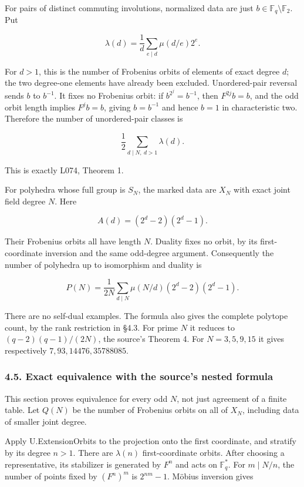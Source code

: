 \documentclass[
  11pt,
  a4paper,
]{article}
\begin{document}
For pairs of distinct commuting involutions, normalized data are just
\(b\in\mathbb F_q\setminus\mathbb F_2\). Put

\[\lambda(d)=\frac1d\sum_{e\mid d}\mu(d/e)2^e.\]

For \(d>1\), this is the number of Frobenius orbits of elements of exact
degree \(d\); the two degree-one elements have already been excluded.
Unordered-pair reversal sends \(b\) to \(b^{-1}\). It fixes no Frobenius
orbit: if \(b^{2^j}=b^{-1}\), then \(F^{2j}b=b\), and the odd orbit
length implies \(F^jb=b\), giving \(b=b^{-1}\) and hence \(b=1\) in
characteristic two. Therefore the number of unordered-pair classes is

\[\boxed{\frac12\sum_{d\mid N,\ d>1}\lambda(d).}\]

This is exactly L074, Theorem 1.

For polyhedra whose full group is \(S_N\), the marked data are \(X_N\)
with exact joint field degree \(N\). Here

\[A(d)=(2^d-2)(2^d-1).\]

Their Frobenius orbits all have length \(N\). Duality fixes no orbit, by
its first-coordinate inversion and the same odd-degree argument.
Consequently the number of polyhedra up to isomorphism and duality is

\[\boxed{P(N)=\frac1{2N}\sum_{d\mid N}
   \mu(N/d)(2^d-2)(2^d-1).}\]

There are no self-dual examples. The formula also gives the complete
polytope count, by the rank restriction in §4.3. For prime \(N\) it
reduces to \((q-2)(q-1)/(2N)\), the source's Theorem 4. For
\(N=3,5,9,15\) it gives respectively \(7,93,14476,35788085\).

\subsubsection{4.5. Exact equivalence with the source's nested
formula}\label{exact-equivalence-with-the-sources-nested-formula}

This section proves equivalence for every odd \(N\), not just agreement
of a finite table. Let \(Q(N)\) be the number of Frobenius orbits on all
of \(X_N\), including data of smaller joint degree.

Apply U.ExtensionOrbits to the projection onto the first coordinate, and
stratify by its degree \(n>1\). There are \(\lambda(n)\)
first-coordinate orbits. After choosing a representative, its stabilizer
is generated by \(F^n\) and acts on \(\mathbb F_q^*\). For
\(m\mid N/n\), the number of points fixed by \((F^n)^m\) is
\(2^{nm}-1\). Möbius inversion gives
\end{document}

